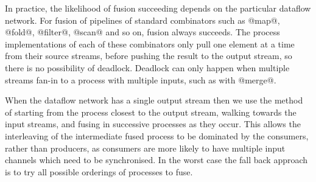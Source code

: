 
In practice, the likelihood of fusion succeeding depends on the particular dataflow network. For fusion of pipelines of standard combinators such as @map@, @fold@, @filter@, @scan@ and so on, fusion always succeeds. The process implementations of each of these combinators only pull one element at a time from their source streams, before pushing the result to the output stream, so there is no possibility of deadlock. Deadlock can only happen when multiple streams fan-in to a process with multiple inputs, such as with @merge@.

When the dataflow network has a single output stream then we use the method of starting from the process closest to the output stream, walking towards the input streams, and fusing in successive processes as they occur. This allows the interleaving of the intermediate fused process to be dominated by the consumers, rather than producers, as consumers are more likely to have multiple input channels which need to be synchronised. In the worst case the fall back approach is to try all possible orderings of processes to fuse.

